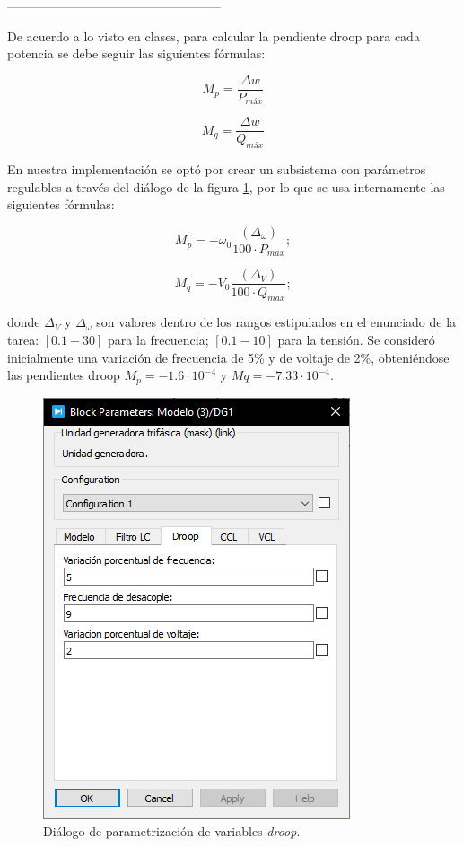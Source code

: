 ---------------------------------------------------


De acuerdo a lo visto en clases, para calcular la pendiente droop para cada potencia se debe seguir las siguientes fórmulas:

\begin{equation}
    M_p = \frac{\Delta w}{P_{máx}}
\end{equation}

\begin{equation}
    M_q = \frac{\Delta w}{Q_{máx}}
\end{equation}

En nuestra implementación se optó por crear un subsistema con parámetros regulables a través del diálogo de la figura \ref{dialogo_dg}, por lo que se usa internamente las siguientes fórmulas:

\begin{equation*}    
M_p = -\omega_0\frac{(\Delta_\omega)}{100\cdot P_{max}};
\end{equation*}

\begin{equation*}
M_q = -V_0\frac{(\Delta_V)}{100\cdot Q_{max}};
\end{equation*}

donde $\Delta_V$ y $\Delta_\omega$ son valores dentro de los rangos estipulados en el enunciado de la tarea: $[0.1 - 30]$ para la frecuencia; $[0.1 - 10]$ para la tensión. Se consideró inicialmente una variación de frecuencia de 5\% y de voltaje de 2\%, obteniéndose las pendientes droop $M_p = -1.6\cdot 10^{-4}$ y $ Mq = -7.33 \cdot 10^{-4}$.\\

\begin{figure}
   \centering
   \includegraphics[width=0.5\linewidth]{Tarea 1/report/imagenes/p2a/dialogo_dg.png}
   \caption{Diálogo de parametrización de variables \textit{droop}.}
   \label{dialogo_dg}
\end{figure}


